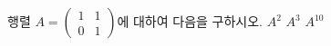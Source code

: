 \hspace*{2mm}\begin{minipage}[t]{\dimexpr\linewidth-2mm\relax}\vspace{0pt}
행렬 $A=\begin{pmatrix} 1 & 1 \\ 0 & 1 \end{pmatrix}$에 대하여 다음을 구하시오.
 $A^2$
 $A^3$
 $A^{10}$\end{minipage}
